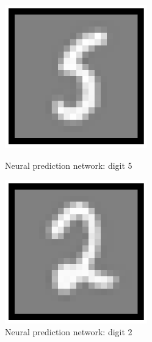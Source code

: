  \begin{figure}[!h]
     \begin{minipage}{.48\linewidth}
         \begin{center}
             \includegraphics[width=0.55\textwidth]{./img/1.30.png}
             \caption{\label{fig:1.30}Neural prediction network: digit 5}  
         \end{center}
     \end{minipage}\hfill
     \begin{minipage}{.48\linewidth}
         \begin{center}
             \includegraphics[width=0.55\textwidth]{./img/1.31.png}
             \caption{\label{fig:1.31}Neural prediction network: digit 2}  
         \end{center}
     \end{minipage}
 \end{figure}

   
\clearpage

















    

   

   


